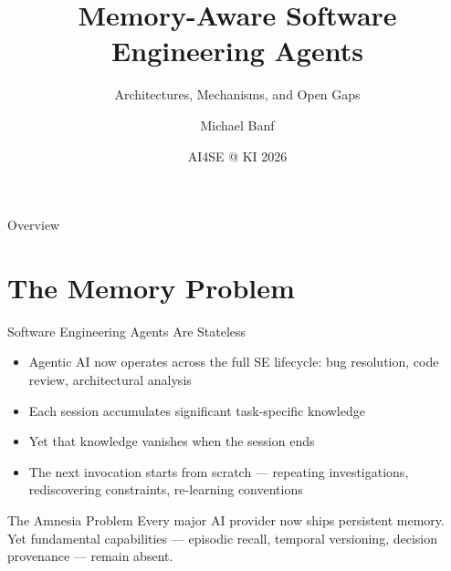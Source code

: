 \documentclass[aspectratio=169]{beamer}
\title{Memory-Aware Software Engineering Agents}
\subtitle{Architectures, Mechanisms, and Open Gaps}
\author{Michael Banf}
\institute{Perelyn GmbH, Munich}
\date{AI4SE @ KI 2026}
\begin{document}
\begin{frame}[plain]
  \titlepage
\end{frame}

\begin{frame}{Overview}
  \tableofcontents
\end{frame}

\section{The Memory Problem}

\begin{frame}[plain]
  \sectionpage
\end{frame}

\begin{frame}{Software Engineering Agents Are Stateless}
  \begin{itemize}
    \item Agentic AI now operates across the \alert{full SE lifecycle}:
      bug resolution, code review, architectural analysis
    \item Each session accumulates significant task-specific knowledge
    \item Yet that knowledge \alert{vanishes when the session ends}
    \item The next invocation starts from scratch --- repeating investigations,
      rediscovering constraints, re-learning conventions
  \end{itemize}

  \vspace{0.4cm}

  \begin{block}{The Amnesia Problem}
    Every major AI provider now ships persistent memory.\\
    Yet fundamental capabilities --- episodic recall, temporal versioning,
    decision provenance --- remain absent.
  \end{block}
\end{frame}
\end{document}
